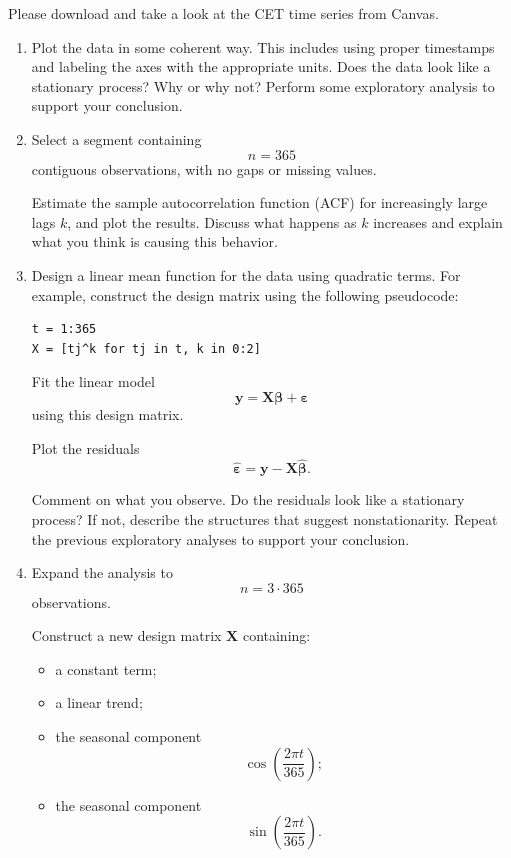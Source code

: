 \documentclass[lang=en,11pt,a4paper,citestyle =authoryear]{elegantpaper}
\begin{document}
Please download and take a look at the CET time series from Canvas.

\begin{enumerate}[label=\arabic*., leftmargin=*]

    \item
    Plot the data in some coherent way. This includes using proper
    timestamps and labeling the axes with the appropriate units. Does the data look like a stationary process? Why or why not? Perform some exploratory analysis to support your conclusion.

    \item
    Select a segment containing
    \[
        n=365
    \]
    contiguous observations, with no gaps or missing values.

    Estimate the sample autocorrelation function (ACF) for increasingly
    large lags \(k\), and plot the results. Discuss what happens as
    \(k\) increases and explain what you think is causing this behavior.

    \item
    Design a linear mean function for the data using quadratic terms.
    For example, construct the design matrix using the following
    pseudocode:

\begin{lstlisting}
t = 1:365
X = [tj^k for tj in t, k in 0:2]
\end{lstlisting}

    Fit the linear model
    \[
        \mathbf{y}
        =
        \mathbf{X}\boldsymbol{\beta}
        +
        \boldsymbol{\varepsilon}
    \]
    using this design matrix.

    Plot the residuals
    \[
        \widehat{\boldsymbol{\varepsilon}}
        =
        \mathbf{y}
        -
        \mathbf{X}\widehat{\boldsymbol{\beta}}.
    \]

    Comment on what you observe. Do the residuals look like a stationary
    process? If not, describe the structures that suggest
    nonstationarity. Repeat the previous exploratory analyses to support
    your conclusion.

    \item[\textbf{4\(^{\ast}\).}]
    Expand the analysis to
    \[
        n=3\cdot365
    \]
    observations.

    Construct a new design matrix \(\mathbf{X}\) containing:

    \begin{itemize}
        \item a constant term;
        \item a linear trend;
        \item the seasonal component
        \[
            \cos\left(\frac{2\pi t}{365}\right);
        \]
        \item the seasonal component
        \[
            \sin\left(\frac{2\pi t}{365}\right).
        \]
    \end{itemize}


\end{enumerate}
\end{document}

